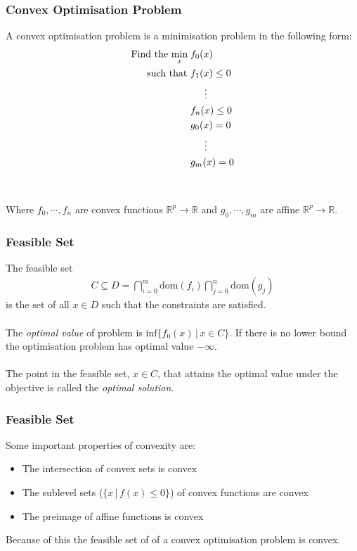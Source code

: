 \documentclass{beamer}
\def\rnum{\mathbb{R}}
\begin{document}
\begin{frame}
    \frametitle{Convex Optimisation Problem}
    A convex optimisation problem is a minimisation problem in the following
    form:
    {\footnotesize
    \begin{align*}
        \text{Find the }\underset{x}{\text{min}}\; &f_{0}(x) \\
        \text{  such that }&f_{1}(x) \leq 0 \\
        & \hspace{5mm} \vdots \\
        &f_{n}(x) \leq 0 \\
        &g_{0}(x) = 0 \\
        &\hspace{5mm} \vdots \\
        &g_{m}(x) = 0
    \end{align*}}
    \\~\\
    Where $f_0,\cdots, f_n$ are convex functions $\rnum^{p} \rightarrow \rnum$ and $g_0, \cdots, g_m$ are
    affine $\rnum^{p} \rightarrow \rnum$.
\end{frame}

\begin{frame}
    \frametitle{Feasible Set}
    The feasible set
    \begin{align*}
    C \subseteq D =
    \bigcap\limits_{i=0}^{m}\text{dom}(f_{i})\bigcap\limits_{j=0}^{n}\text{dom}(g_{j})
    \end{align*}
    is the set of all $x \in D$ such that the constraints are satisfied.
    \\~\\
    The \textit{optimal value} of problem is $\text{inf} \{f_{0}(x) \, | \, x
    \in C \}$. If there is no lower bound the optimisation problem has optimal
    value $-\infty$.
    \\~\\
    The point in the feasible set, $x \in C$, that attains the optimal value
    under the objective is called the \textit{optimal solution}.
\end{frame}

\begin{frame}
    \frametitle{Feasible Set}
    Some important properties of convexity are:
    \begin{itemize}
        \item The intersection of convex sets is convex
        \item The sublevel sets ($\{x \, | \, f(x) \leq 0 \}$) of convex
            functions are convex
        \item The preimage of affine functions is convex
    \end{itemize}
    Because of this the feasible set of of a convex optimisation problem is
    convex.
\end{frame}
\end{document}
